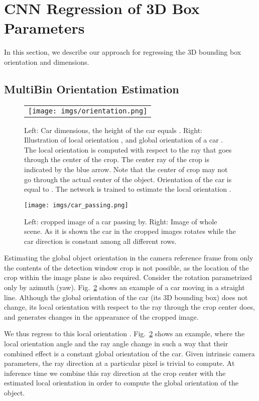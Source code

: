 \documentclass[10pt,twocolumn,letterpaper]{article}
\begin{document}
\section{CNN Regression of 3D Box Parameters}
\label{sec:cnn_regression}
In this section, we describe our approach for regressing the 3D bounding box orientation and dimensions.
\subsection{MultiBin Orientation Estimation}
\label{subsec:orientation_regression}
\begin{figure}
\begin{tabular}{c}
\texttt{[image: imgs/orientation.png]}
\end{tabular}
\caption{Left: Car dimensions, the height of the car equals . Right: Illustration of local orientation , and global orientation of a car . The local orientation is computed with respect to the ray that goes through the center of the crop. The center ray of the crop is indicated by the blue arrow. Note that the center of crop may not go through the actual center of the object. Orientation of the car  is equal to  . The network is trained to estimate the local orientation .}
\label{fig:ray}
\end{figure}
\begin{figure}
\texttt{[image: imgs/car\_passing.png]}
\caption{Left: cropped image of a car passing by. Right: Image of whole scene. As it is shown the car in the cropped images rotates while the car direction is constant among all different rows. }
\label{fig:car_passing}
\end{figure}

Estimating the global object orientation  in the camera reference frame from only the contents of the detection window crop is not possible, as the location of the crop within the image plane is also required.  Consider the rotation  parametrized  only  by azimuth  (yaw). Fig.~\ref{fig:car_passing} shows an example of a car moving in a straight line. Although the global orientation  of the car (its 3D bounding box) does not change, its local orientation   with respect to the ray through the crop center does, and generates changes in the appearance of the cropped image. 

We thus regress to this local orientation  .
Fig.~\ref{fig:car_passing} shows an example, where the local orientation angle  and the ray angle change in such a way that their combined effect is a constant global orientation of the car. 
Given intrinsic camera parameters, the ray direction at a particular pixel is trivial to compute. At inference time we combine this ray direction at the crop center with the estimated local orientation in order to compute the global orientation of the object. 
\end{document}
